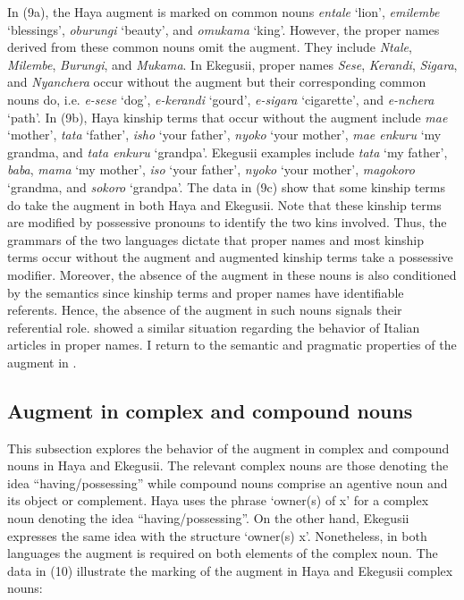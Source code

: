 \documentclass[output=paper]{langscibook}
\begin{document}
\begin{sloppypar}\noindent In (9a), the Haya augment is marked on common nouns \textit{entale} ‘lion’, \textit{emilembe} ‘blessings’, \textit{oburungi} ‘beauty’, and \textit{omukama} ‘king’. However, the proper names derived from these common nouns omit the augment. They include \textit{Ntale}, \textit{Milembe}, \textit{Burungi}, and \textit{Mukama}. In Ekegusii, proper names \textit{Sese}, \textit{Kerandi}, \textit{Sigara}, and \textit{Nyanchera} occur without the augment but their corresponding common nouns do, i.e. \textit{e-sese} ‘dog’, \textit{e-kerandi} ‘gourd’, \textit{e-sigara} ‘cigarette’, and \textit{e-nchera} ‘path’. In (9b), Haya kinship terms that occur without the augment include \textit{mae} ‘mother’, \textit{tata} ‘father’, \textit{isho} ‘your father’, \textit{nyoko} ‘your mother’, \textit{mae enkuru} ‘my grandma, and \textit{tata enkuru} ‘grandpa’. Ekegusii examples include \textit{tata} ‘my father’, \textit{baba}, \textit{mama} ‘my mother’, \textit{iso} ‘your father’, \textit{nyoko} ‘your mother’, \textit{magokoro} ‘grandma, and \textit{sokoro} ‘grandpa’. The data in (9c) show that some kinship terms do take the augment in both Haya and Ekegusii. Note that these kinship terms are modified by possessive pronouns to identify the two kins involved. Thus, the grammars of the two languages dictate that proper names and most kinship terms occur without the augment and augmented kinship terms take a possessive modifier. Moreover, the absence of the augment in these nouns is also conditioned by the semantics since kinship terms and proper names have identifiable referents. Hence, the absence of the augment in such nouns signals their referential role. \citet{longobardi1994reference} showed a similar situation regarding the behavior of Italian articles in proper names. I return to the semantic and pragmatic properties of the augment in .\end{sloppypar}


\subsection{Augment in complex and compound nouns}
This subsection explores the behavior of the augment in complex and compound nouns in Haya and Ekegusii. The relevant complex nouns are those denoting the idea “having/possessing” while compound nouns comprise an agentive noun and its object or complement. Haya uses the phrase ‘owner(s) of x’ for a complex noun denoting the idea “having/possessing”. On the other hand, Ekegusii expresses the same idea with the structure ‘owner(s) x’. Nonetheless, in both languages the augment is required on both elements of the complex noun. The data in (10) illustrate the marking of the augment in Haya and Ekegusii complex nouns:
\end{document}
